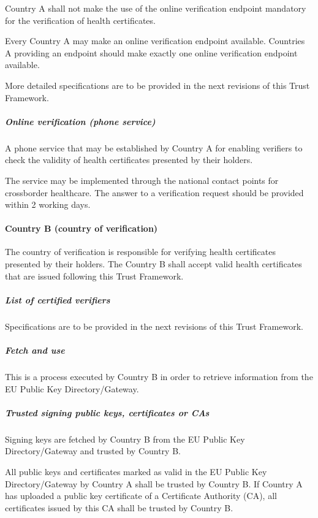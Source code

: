 \documentclass[a4paper,12pt,english]{sphinxhowto}
\begin{document}
\sphinxAtStartPar
Country A shall not make the use of the online verification endpoint mandatory for the verification of health certificates.

\sphinxAtStartPar
Every Country A may make an online verification endpoint available. Countries A providing an endpoint should make exactly one online verification endpoint available.

\sphinxAtStartPar
More detailed specifications are to be provided in the next revisions of this Trust Framework.


\subparagraph{Online verification (phone service)}
\label{\detokenize{ssi/annotehealth:online-verification-phone-service}}
\sphinxAtStartPar
A phone service that may be established by Country A for enabling verifiers to check the validity of health certificates presented by their holders.

\sphinxAtStartPar
The service may be implemented through the national contact points for cross\sphinxhyphen{}border healthcare. The answer to a verification request should be provided within 2 working days.


\paragraph{Country B (country of verification)}
\label{\detokenize{ssi/annotehealth:country-b-country-of-verification}}
\sphinxAtStartPar
The country of verification is responsible for verifying health certificates presented by their holders. The Country B shall accept valid health certificates that are issued following this Trust Framework.


\subparagraph{List of certified verifiers}
\label{\detokenize{ssi/annotehealth:list-of-certified-verifiers}}
\sphinxAtStartPar
Specifications are to be provided in the next revisions of this Trust Framework.


\subparagraph{Fetch and use}
\label{\detokenize{ssi/annotehealth:fetch-and-use}}
\sphinxAtStartPar
This is a process executed by Country B in order to retrieve information from the EU Public Key Directory/Gateway.


\subparagraph{Trusted signing public keys, certificates or CAs}
\label{\detokenize{ssi/annotehealth:trusted-signing-public-keys-certificates-or-cas}}
\sphinxAtStartPar
Signing keys are fetched by Country B from the EU Public Key Directory/Gateway and trusted by Country B.

\sphinxAtStartPar
All public keys and certificates marked as valid in the EU Public Key Directory/Gateway by Country A shall be trusted by Country B. If Country A has uploaded a public key certificate of a Certificate Authority (CA), all certificates issued by this CA shall be trusted by Country B.
\end{document}
